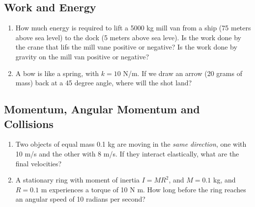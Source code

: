 \documentclass[10pt]{article}
\begin{document}
\subsection{Work and Energy}
\begin{enumerate}
\item How much energy is required to lift a 5000 kg mill van from a ship (75 meters above sea level) to the dock (5 meters above sea leve).  Is the work done by the crane that lifs the mill vane positive or negative?  Is the work done by gravity on the mill van positive or negative?
\item A bow is like a spring, with $k=10$ N/m.  If we draw an arrow (20 grams of mass) back at a 45 degree angle, where will the shot land?
\end{enumerate}
\subsection{Momentum, Angular Momentum and Collisions}
\begin{enumerate}
\item Two objects of equal mass 0.1 kg are moving in the \textit{same direction}, one with 10 m/s and the other with 8 m/s.  If they interact elastically, what are the final velocities?
\item A stationary ring with moment of inertia $I=MR^2$, and $M = 0.1$ kg, and $R = 0.1$ m experiences a torque of 10 N m.  How long before the ring reaches an angular speed of 10 radians per second?
\end{enumerate}
\end{document}
